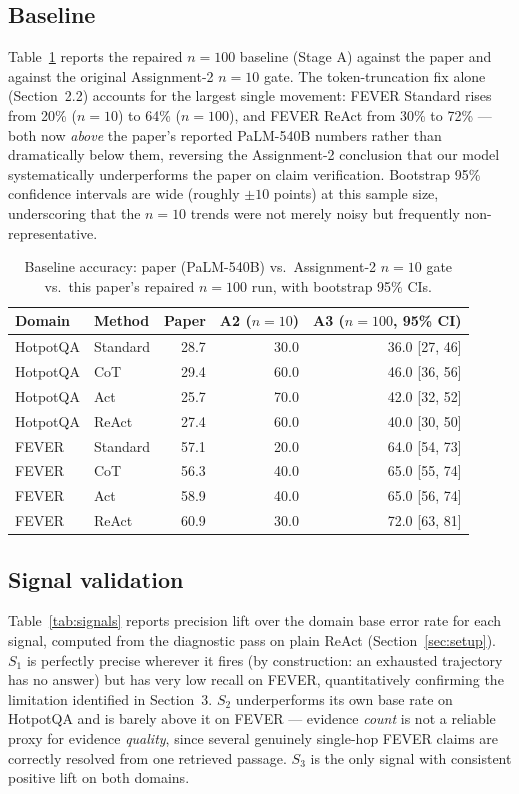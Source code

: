 \subsection{Baseline}
\label{sec:results}
Table~\ref{tab:baseline} reports the repaired $n{=}100$ baseline (Stage A)
against the paper and against the original Assignment-2 $n{=}10$ gate. The
token-truncation fix alone (Section~2.2) accounts for the largest single
movement: FEVER Standard rises from 20\% ($n{=}10$) to 64\% ($n{=}100$),
and FEVER ReAct from 30\% to 72\% --- both now \emph{above} the paper's
reported PaLM-540B numbers rather than dramatically below them, reversing
the Assignment-2 conclusion that our model systematically underperforms
the paper on claim verification. Bootstrap 95\% confidence intervals are
wide (roughly $\pm 10$ points) at this sample size, underscoring that the
$n{=}10$ trends were not merely noisy but frequently non-representative.

\begin{table}[t]
\caption{Baseline accuracy: paper (PaLM-540B) vs.\ Assignment-2 $n{=}10$
gate vs.\ this paper's repaired $n{=}100$ run, with bootstrap 95\% CIs.}
\label{tab:baseline}
\centering\small
\begin{tabular}{@{}llrrr@{}}
\toprule
Domain & Method & Paper & A2 ($n{=}10$) & A3 ($n{=}100$, 95\% CI) \\
\midrule
HotpotQA & Standard & 28.7 & 30.0 & 36.0 [27, 46] \\
HotpotQA & CoT      & 29.4 & 60.0 & 46.0 [36, 56] \\
HotpotQA & Act      & 25.7 & 70.0 & 42.0 [32, 52] \\
HotpotQA & ReAct    & 27.4 & 60.0 & 40.0 [30, 50] \\
FEVER    & Standard & 57.1 & 20.0 & 64.0 [54, 73] \\
FEVER    & CoT      & 56.3 & 40.0 & 65.0 [55, 74] \\
FEVER    & Act      & 58.9 & 40.0 & 65.0 [56, 74] \\
FEVER    & ReAct    & 60.9 & 30.0 & 72.0 [63, 81] \\
\bottomrule
\end{tabular}
\end{table}

\subsection{Signal validation}
Table~\ref{tab:signals} reports precision lift over the domain base error
rate for each signal, computed from the diagnostic pass on plain ReAct
(Section~\ref{sec:setup}). $S_1$ is perfectly precise wherever it fires
(by construction: an exhausted trajectory has no answer) but has very low
recall on FEVER, quantitatively confirming the limitation identified in
Section~3. $S_2$ underperforms its own base rate on HotpotQA and is barely
above it on FEVER --- evidence \emph{count} is not a reliable proxy for
evidence \emph{quality}, since several genuinely single-hop FEVER claims
are correctly resolved from one retrieved passage. $S_3$ is the only
signal with consistent positive lift on both domains.

